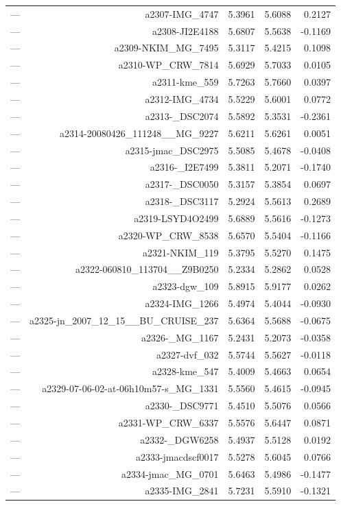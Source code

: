 \begin{table}[htbp]
\begin{tabular}{lrrrr}
— & a2307-IMG_4747 & 5.3961 & 5.6088 & 0.2127 \\
— & a2308-JI2E4188 & 5.6807 & 5.5638 & -0.1169 \\
— & a2309-NKIM_MG_7495 & 5.3117 & 5.4215 & 0.1098 \\
— & a2310-WP_CRW_7814 & 5.6929 & 5.7033 & 0.0105 \\
— & a2311-kme_559 & 5.7263 & 5.7660 & 0.0397 \\
— & a2312-IMG_4734 & 5.5229 & 5.6001 & 0.0772 \\
— & a2313-_DSC2074 & 5.5892 & 5.3531 & -0.2361 \\
— & a2314-20080426_111248__MG_9227 & 5.6211 & 5.6261 & 0.0051 \\
— & a2315-jmac_DSC2975 & 5.5085 & 5.4678 & -0.0408 \\
— & a2316-_I2E7499 & 5.3811 & 5.2071 & -0.1740 \\
— & a2317-_DSC0050 & 5.3157 & 5.3854 & 0.0697 \\
— & a2318-_DSC3117 & 5.2924 & 5.5613 & 0.2689 \\
— & a2319-LSYD4O2499 & 5.6889 & 5.5616 & -0.1273 \\
— & a2320-WP_CRW_8538 & 5.6570 & 5.5404 & -0.1166 \\
— & a2321-NKIM_119 & 5.3795 & 5.5270 & 0.1475 \\
— & a2322-060810_113704__Z9B0250 & 5.2334 & 5.2862 & 0.0528 \\
— & a2323-dgw_109 & 5.8915 & 5.9177 & 0.0262 \\
— & a2324-IMG_1266 & 5.4974 & 5.4044 & -0.0930 \\
— & a2325-jn_2007_12_15__BU_CRUISE_237 & 5.6364 & 5.5688 & -0.0675 \\
— & a2326-_MG_1167 & 5.2431 & 5.2073 & -0.0358 \\
— & a2327-dvf_032 & 5.5744 & 5.5627 & -0.0118 \\
— & a2328-kme_547 & 5.4009 & 5.4663 & 0.0654 \\
— & a2329-07-06-02-at-06h10m57-s_MG_1331 & 5.5560 & 5.4615 & -0.0945 \\
— & a2330-_DSC9771 & 5.4510 & 5.5076 & 0.0566 \\
— & a2331-WP_CRW_6337 & 5.5576 & 5.6447 & 0.0871 \\
— & a2332-_DGW6258 & 5.4937 & 5.5128 & 0.0192 \\
— & a2333-jmacdscf0017 & 5.5278 & 5.6045 & 0.0766 \\
— & a2334-jmac_MG_0701 & 5.6463 & 5.4986 & -0.1477 \\
— & a2335-IMG_2841 & 5.7231 & 5.5910 & -0.1321 \\

\end{tabular}
\end{table}
